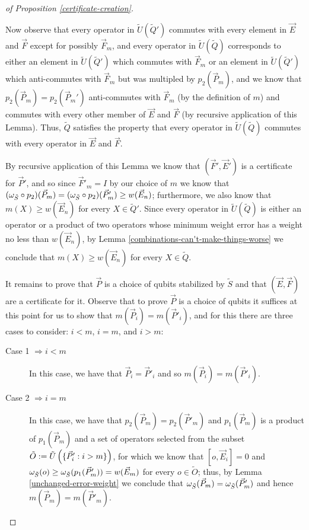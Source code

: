 \documentclass[twocolumn,showpacs,preprintnumbers,amsmath,amssymb,nofootinbib,pra,floatfix]{revtex4-1}
\newcommand{\lst}{\vec}
\newcommand{\set}{\tilde}
\begin{document}
\begin{proof}[of Proposition \ref{certificate-creation}]
\begin{description}
Now observe that every operator in $\set U(\set Q')$ commutes with every element in $\lst E$ and $\lst F$ except for possibly $\lst F_m$, and every operator in $\set U(\set Q)$ corresponds to either an element in $\set U(\set Q')$ which commutes with $\lst F_m$ or an element in $\set U(\set Q')$ which anti-commutes with $\lst F_m$ but was multipled by $p_2(\lst P_m)$, and we know that $p_2(\lst P_m)=p_2(\lst P_m')$ anti-commutes with $\lst F_m$ (by the definition of $m$) and commutes with every other member of $\lst E$ and $\lst F$ (by recursive application of this Lemma).  Thus, $\set Q$ satisfies the property that every operator in $\set U(\set Q)$ commutes with every operator in $\lst E$ and $\lst F$.

By recursive application of this Lemma we know that $(\lst F',\lst E')$ is a certificate for $\lst P'$, and so since $\lst F'_m=I$ by our choice of $m$ we know that $(\om_{\set S}\circ p_2)(\lst P_m)=(\om_{\set S}\circ p_2)(\lst P_m')\ge w(\lst E_n)$;  furthermore, we also know that $m(X)\ge w(\lst E_n)$ for every $X\in \set Q'$.  Since every operator in $\set U(\set Q)$ is either an operator or a product of two operators whose minimum weight error has a weight no less than $w(\lst E_n)$, by Lemma \ref{combinations-can't-make-things-worse} we conclude that $m(X)\ge w(\lst E_n)$ for every $X\in \set Q$.

It remains to prove that $\lst P$ is a choice of qubits stabilized by $\set S$ and that $(\lst E,\lst F)$ are a certificate for it.  Observe that to prove $\lst P$ is a choice of qubits it suffices at this point for us to show that $m(\lst P_i)=m(\lst P'_i)$, and for this there are three cases to consider: $i<m$, $i=m$, and $i>m$:

\begin{description}
\item[Case 1 $\Rightarrow i < m$]
In this case, we have that $\lst P_i=\lst P'_i$ and so $m(\lst P_i)=m(\lst P'_i)$.

\item[Case 2 $\Rightarrow i = m$]
In this case, we have that $p_2(\lst P_m)=p_2(\lst P'_m)$ and $p_1(\lst P_m)$ is a product of $p_1(\lst P_m)$ and a set of operators selected from the subset $\set O := \set U\paren{\{\lst P_i' : i > m \}}$, for which we know that $[o,\lst E_i]=0$ and $\om_{\set S}(o)\ge \om_{\set S}(p_1(\lst P'_m))=w(\lst E_m)$ for every $o\in \set O$;  thus, by Lemma \ref{unchanged-error-weight} we conclude that $\om_{\set S}(\lst P_m)=\om_{\set S}(\lst P'_m)$ and hence $m(\lst P_m)=m(\lst P'_m).$


\end{description}
\end{description}
\end{proof}
\end{document}
